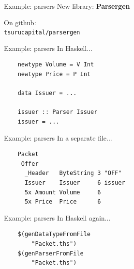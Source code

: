 \documentclass[20pt]{beamer}
\newcommand{\vspaced}{
    \vspace{5mm}
}
\begin{document}
\begin{frame}{Example: parsers}
    New library: \textbf{Parsergen} \\
    \vspaced
    On github: \\
    \texttt{tsurucapital/parsergen}
\end{frame}

\begin{frame}[fragile]{Example: parsers}
    In Haskell... \\
    \vspaced
    \begin{lstlisting}
    newtype Volume = V Int
    newtype Price = P Int

    data Issuer = ...

    issuer :: Parser Issuer
    issuer = ...
    \end{lstlisting}
\end{frame}

\begin{frame}[fragile]{Example: parsers}
    In a separate file...
    \vspaced
    \begin{lstlisting}
    Packet
     Offer
      _Header   ByteString 3 "OFF"
      Issuer    Issuer     6 issuer
      5x Amount Volume     6
      5x Price  Price      6
    \end{lstlisting}
\end{frame}

\begin{frame}[fragile]{Example: parsers}
    In Haskell again... \\
    \vspaced
    \begin{lstlisting}
    $(genDataTypeFromFile
        "Packet.ths")
    $(genParserFromFile
        "Packet.ths")
    \end{lstlisting}
\end{frame}
\end{document}
